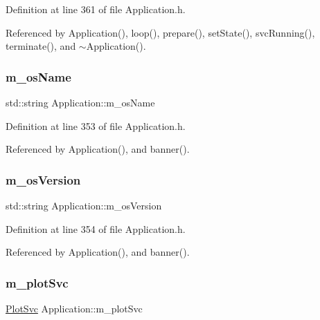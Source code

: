 Definition at line 361 of file Application.\+h.



Referenced by Application(), loop(), prepare(), set\+State(), svc\+Running(), terminate(), and $\sim$\+Application().

\mbox{\label{classApplication_a59f90c6ff4ee3db646ca656c71cc77e7}} 
\subsubsection{\texorpdfstring{m\+\_\+os\+Name}{m\_osName}}
{\footnotesize\ttfamily std\+::string Application\+::m\+\_\+os\+Name\hspace{0.3cm}{\ttfamily [protected]}}



Definition at line 353 of file Application.\+h.



Referenced by Application(), and banner().

\mbox{\label{classApplication_a17949f767d2598e92acb0885bb399dc0}} 
\subsubsection{\texorpdfstring{m\+\_\+os\+Version}{m\_osVersion}}
{\footnotesize\ttfamily std\+::string Application\+::m\+\_\+os\+Version\hspace{0.3cm}{\ttfamily [protected]}}



Definition at line 354 of file Application.\+h.



Referenced by Application(), and banner().

\mbox{\label{classApplication_a30d5600ea5e4f36b14f25f903ee3256e}} 
\subsubsection{\texorpdfstring{m\+\_\+plot\+Svc}{m\_plotSvc}}
{\footnotesize\ttfamily \hyperlink{Application_8h_abaa10d33ca2837dfcf8ba9bff40cdbb6}{Plot\+Svc} Application\+::m\+\_\+plot\+Svc\hspace{0.3cm}{\ttfamily [private]}}



